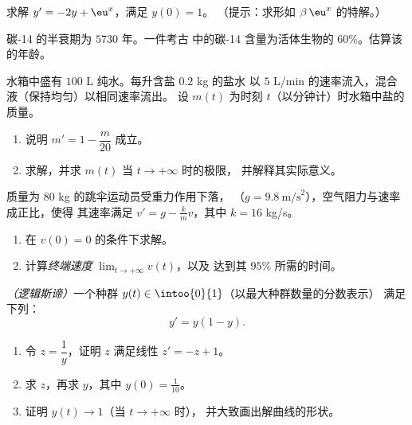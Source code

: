 \begin{exercise}[$\star\star$]\label{exo:g12:diffeq:4}
求解 $y' = -2y + \eu^{x}$，满足 $y(0) = 1$。
（提示：求形如 $\beta\,\eu^{x}$ 的特解。）
\end{exercise}

\begin{exercise}[$\star\star$]\label{exo:g12:diffeq:5}
碳-14 的半衰期为 $5730$ 年。一件考古
中的碳-14 含量为活体生物的 $60\%$。估算该的年龄。
\end{exercise}

\begin{exercise}[$\star\star$]\label{exo:g12:diffeq:6}
水箱中盛有 $100$ L 纯水。每升含盐 $0.2$ kg 的盐水
以 $5$ L/min 的速率流入，混合液（保持均匀）以相同速率流出。
设 $m(t)$ 为时刻 $t$（以分钟计）时水箱中盐的质量。
\begin{enumerate}
  \item 说明 $m' = 1 - \dfrac{m}{20}$ 成立。
  \item 求解，并求 $m(t)$ 当 $t \to +\infty$ 时的极限，
        并解释其实际意义。
\end{enumerate}
\end{exercise}

\begin{exercise}[$\star\star$]\label{exo:g12:diffeq:7}
质量为 $80$ kg 的跳伞运动员受重力作用下落，
（$g = 9.8\ \text{m/s}^2$），空气阻力与速率成正比，使得
其速率满足 $v' = g - \frac{k}{m}v$，其中 $k = 16$ kg/s。
\begin{enumerate}
  \item 在 $v(0) = 0$ 的条件下求解。
  \item 计算\emph{终端速度} $\lim_{t\to+\infty} v(t)$，以及
        达到其 $95\%$ 所需的时间。
\end{enumerate}
\end{exercise}

\begin{exercise}[$\star\star\star$]\label{exo:g12:diffeq:8}
\emph{（逻辑斯谛）}一个种群 $y(t) \in \intoo{0}{1}$（以最大种群数量的分数表示）
满足下列：
\[
y' = y(1 - y).
\]
\begin{enumerate}
  \item 令 $z = \dfrac{1}{y}$，证明 $z$ 满足线性
        $z' = -z + 1$。
  \item 求 $z$，再求 $y$，其中 $y(0) = \frac{1}{10}$。
  \item 证明 $y(t) \to 1$（当 $t \to +\infty$ 时），
        并大致画出解曲线的形状。
\end{enumerate}
\end{exercise}

